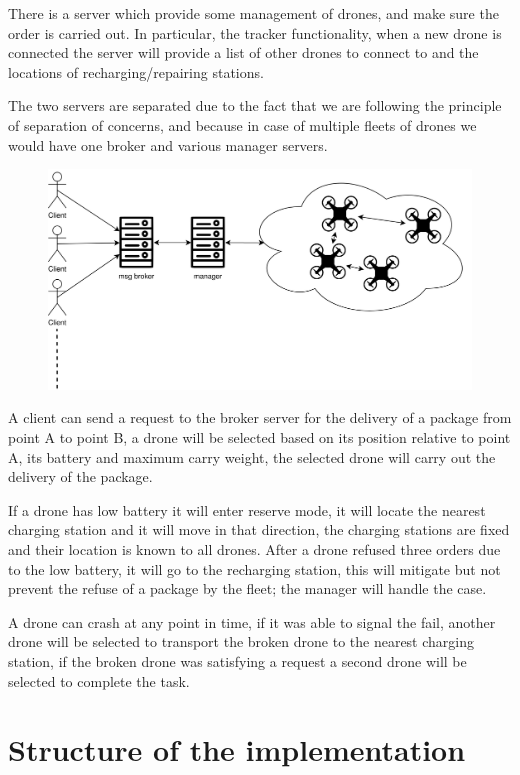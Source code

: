 \documentclass[a4paper, oneside]{memoir}
\begin{document}
There is a server which provide some management of drones, and make sure the order is carried out. In particular, the tracker functionality, when a new drone is connected the server will provide a list of other drones to connect to and the locations of recharging/repairing stations.

The two servers are separated due to the fact that we are following the principle of separation of concerns, and because in case of multiple fleets of drones we would have one broker and various manager servers.

\begin{figure}[h!]
	\centering
	\includegraphics[width=\linewidth]{Overview}
\end{figure}

A client can send a request to the broker server for the delivery of a package from point A to point B, a drone will be selected based on its position relative to point A, its  battery and maximum carry weight, the selected drone will carry out the delivery of the package.

If a drone has low battery it will enter reserve mode, it will locate the nearest charging station and it will move in that direction, the charging stations are fixed and their location is known to all drones. After a drone refused three orders due to the low battery, it will go to the recharging station, this will mitigate but not prevent the refuse of a package by the fleet; the manager will handle the case.

A drone can crash at any point in time, if it was able to signal the fail, another drone will be selected to transport the broken drone to the nearest charging station, if the broken drone was satisfying a request a second drone will be selected to complete the task.


\section{Structure of the implementation}
\end{document}

